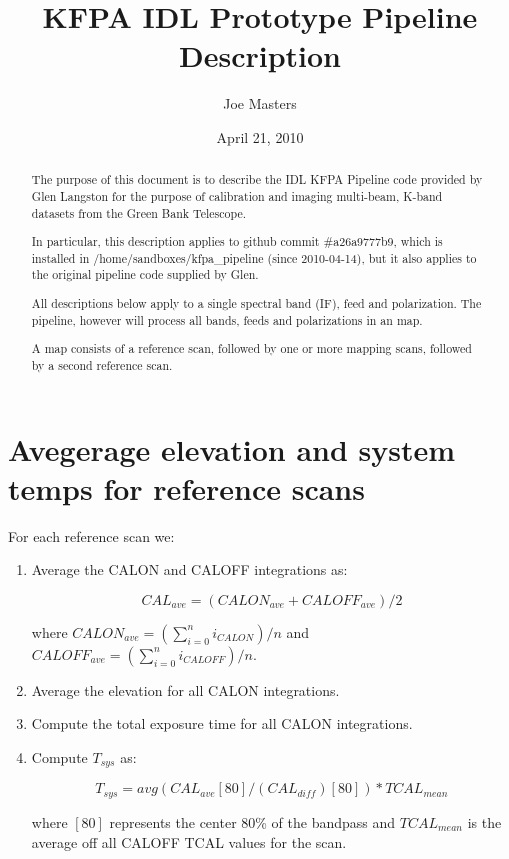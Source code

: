 \documentclass[11pt]{article}
\begin{document}
\title{KFPA IDL Prototype Pipeline Description}
\author{Joe Masters}
\date{April 21, 2010}
\maketitle

\begin{abstract}
The purpose of this document is to describe the IDL KFPA Pipeline code provided by Glen Langston for the purpose of calibration and imaging multi-beam, K-band datasets from the Green Bank Telescope.

In particular, this description applies to github commit \#a26a9777b9, which is installed in /home/sandboxes/kfpa\_pipeline (since 2010-04-14), but it also applies to the original pipeline code supplied by Glen.

All descriptions below apply to a single spectral band (IF), feed and polarization.  The pipeline, however will process all bands, feeds and polarizations in an map.

A map consists of a reference scan, followed by one or more mapping scans, followed by a second reference scan.
\end{abstract}

\section{Avegerage elevation and system temps for reference scans}

For each reference scan we:

\begin{enumerate}

\item Average the CALON and CALOFF integrations as:

\begin{equation}
CAL_{ave} = (CALON_{ave} + CALOFF_{ave}) / 2
\end{equation}

where $CALON_{ave} = (\sum\limits_{i=0}^n i_{CALON}) / n$ and $CALOFF_{ave} = (\sum\limits_{i=0}^n i_{CALOFF}) / n$.

\item Average the elevation for all CALON integrations.

\item Compute the total exposure time for all CALON integrations.

\item Compute $T_{sys}$ as:

\begin{equation}
T_{sys} = avg( CAL_{ave}[80] / (CAL_{diff})[80] ) * TCAL_{mean}
\end{equation}

where $[80]$ represents the center 80\% of the bandpass and $TCAL_{mean}$ is the average off all CALOFF TCAL values for the scan.

\end{enumerate}
\end{document}

